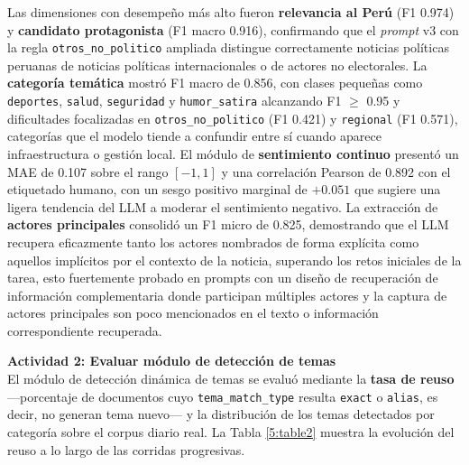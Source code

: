 Las dimensiones con desempeño más alto fueron \textbf{relevancia al Perú}
(F1 0.974) y \textbf{candidato protagonista} (F1 macro 0.916), confirmando
que el \textit{prompt} v3 con la regla \texttt{otros\_no\_politico} ampliada
distingue correctamente noticias políticas peruanas de noticias políticas
internacionales o de actores no electorales. La \textbf{categoría temática}
mostró F1 macro de 0.856, con clases pequeñas como \texttt{deportes},
\texttt{salud}, \texttt{seguridad} y \texttt{humor\_satira} alcanzando F1
$\geq$ 0.95 y dificultades focalizadas en \texttt{otros\_no\_politico}
(F1 0.421) y \texttt{regional} (F1 0.571), categorías que el modelo tiende a
confundir entre sí cuando aparece infraestructura o gestión local. El módulo
de \textbf{sentimiento continuo} presentó un MAE de 0.107 sobre el rango
$[-1, 1]$ y una correlación Pearson de 0.892 con el etiquetado humano, con
un sesgo positivo marginal de $+0.051$ que sugiere una ligera tendencia del
LLM a moderar el sentimiento negativo. La extracción de \textbf{actores principales} consolidó un F1 micro de 0.825, demostrando que el LLM recupera eficazmente tanto los actores nombrados de forma explícita como aquellos implícitos por el contexto de la noticia, superando los retos iniciales de la tarea, esto fuertemente probado en prompts con un diseño de recuperación de información complementaria donde participan múltiples actores y la captura de actores principales son poco mencionados en el texto o información correspondiente recuperada.

\textbf{Actividad 2: Evaluar módulo de detección de temas}
\\
El módulo de detección dinámica de temas se evaluó mediante la \textbf{tasa
de reuso} —porcentaje de documentos cuyo \texttt{tema\_match\_type} resulta
\texttt{exact} o \texttt{alias}, es decir, no generan tema nuevo— y la
distribución de los temas detectados por categoría sobre el corpus diario
real. La Tabla \ref{5:table2} muestra la evolución del reuso a lo largo de
las corridas progresivas.

